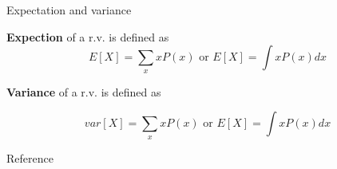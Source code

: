 \documentclass[ignorenonframetext,]{beamer}
\begin{document}
\begin{frame}{Expectation and variance}
\protect\hypertarget{expectation-and-variance}{}

\textbf{Expection} of a r.v. is defined as
\[E[X] = \sum_x x P(x) \text{ or } E[X] = \int x P(x)dx\]

\textbf{Variance} of a r.v. is defined as

\[var[X] = \sum_x x P(x) \text{ or } E[X] = \int x P(x)dx\]

\end{frame}

\begin{frame}{Reference}
\protect\hypertarget{reference}{}

\end{frame}
\end{document}
